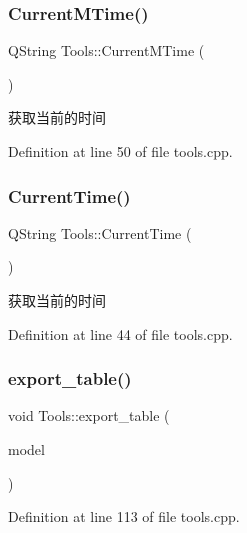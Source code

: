 \subsubsection{\texorpdfstring{CurrentMTime()}{CurrentMTime()}}
{\footnotesize\ttfamily Q\+String Tools\+::\+Current\+M\+Time (\begin{DoxyParamCaption}{ }\end{DoxyParamCaption})}



获取当前的时间 



Definition at line 50 of file tools.\+cpp.

\mbox{\label{class_tools_af10c90501143838d9af896a60026668d}} 
\subsubsection{\texorpdfstring{CurrentTime()}{CurrentTime()}}
{\footnotesize\ttfamily Q\+String Tools\+::\+Current\+Time (\begin{DoxyParamCaption}{ }\end{DoxyParamCaption})}



获取当前的时间 



Definition at line 44 of file tools.\+cpp.

\mbox{\label{class_tools_af6c4eaadfb21ee231cbc4d6384250629}} 
\subsubsection{\texorpdfstring{export\_table()}{export\_table()}}
{\footnotesize\ttfamily void Tools\+::export\+\_\+table (\begin{DoxyParamCaption}\item[{const Q\+Abstract\+Item\+Model \&}]{model }\end{DoxyParamCaption})}



Definition at line 113 of file tools.\+cpp.

\mbox{\label{class_tools_ac18eb440bd7a33e8e242df2cc4d4d4bc}} 
